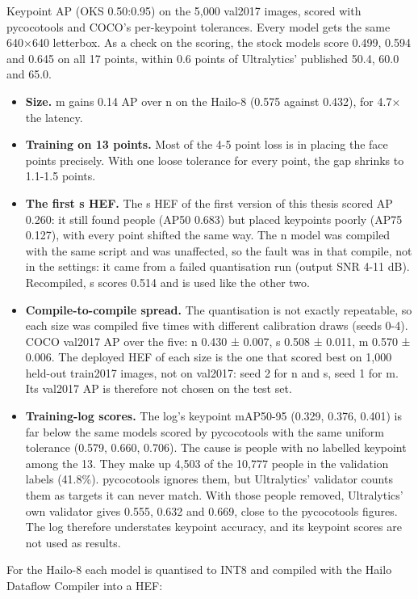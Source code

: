 Keypoint AP (OKS 0.50:0.95) on the 5,000 val2017 images, scored with pycocotools \cite{b15} and COCO's per-keypoint tolerances. Every model gets the same 640×640 letterbox. As a check on the scoring, the stock models score 0.499, 0.594 and 0.645 on all 17 points, within 0.6 points of Ultralytics' published 50.4, 60.0 and 65.0.

\begin{itemize}
\tightlist
\item
  \textbf{Size.} m gains 0.14 AP over n on the Hailo-8 (0.575 against 0.432), for 4.7× the latency.
\item
  \textbf{Training on 13 points.} Most of the 4-5 point loss is in placing the face points precisely. With one loose tolerance for every point, the gap shrinks to 1.1-1.5 points.
\item
  \textbf{The first s HEF.} The s HEF of the first version of this thesis scored AP 0.260: it still found people (AP50 0.683) but placed keypoints poorly (AP75 0.127), with every point shifted the same way. The n model was compiled with the same script and was unaffected, so the fault was in that compile, not in the settings: it came from a failed quantisation run (output SNR 4-11 dB). Recompiled, s scores 0.514 and is used like the other two.
\item
  \textbf{Compile-to-compile spread.} The quantisation is not exactly repeatable, so each size was compiled five times with different calibration draws (seeds 0-4). COCO val2017 AP over the five: n 0.430 ± 0.007, s 0.508 ± 0.011, m 0.570 ± 0.006. The deployed HEF of each size is the one that scored best on 1,000 held-out train2017 images, not on val2017: seed 2 for n and s, seed 1 for m. Its val2017 AP is therefore not chosen on the test set.
\item
  \textbf{Training-log scores.} The log's keypoint mAP50-95 (0.329, 0.376, 0.401) is far below the same models scored by pycocotools with the same uniform tolerance (0.579, 0.660, 0.706). The cause is people with no labelled keypoint among the 13. They make up 4,503 of the 10,777 people in the validation labels (41.8\%). pycocotools ignores them, but Ultralytics' validator counts them as targets it can never match. With those people removed, Ultralytics' own validator gives 0.555, 0.632 and 0.669, close to the pycocotools figures. The log therefore understates keypoint accuracy, and its keypoint scores are not used as results.
\end{itemize}

For the Hailo-8 each model is quantised to INT8 and compiled with the Hailo Dataflow Compiler into a HEF:

